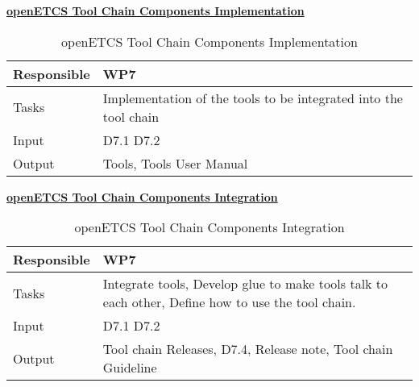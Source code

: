 \documentclass{template/openetcs_article}
\begin{document}
\newpage
\underline{\textbf{openETCS Tool Chain Components Implementation}}
\begin{table}[H]
	\begin{center}	
		\tablehead{\hline
			}
		
		\begin{supertabular}[H]{|p{6cm}|p{8cm}|}
			\hline

			Responsible &
			WP7 \\
			\hline

			Tasks & 
			Implementation of the tools to be integrated into the tool chain\\ \hline

			Input &
			D7.1
			D7.2\\
			\hline

			Output &
			Tools, Tools User Manual\\
			\hline			
		\end{supertabular}
	\end{center}

	\caption{openETCS Tool Chain Components Implementation}
\end{table}

\underline{\textbf{openETCS Tool Chain Components Integration}}
\begin{table}[H]
	\begin{center}


		\begin{supertabular}[H]{|p{6cm}|p{8cm}|}
			\hline
			
			Responsible &
			WP7 \\
			\hline
			

			Tasks &
			Integrate tools, Develop glue to make tools talk to each other, Define how to use the tool chain. \\	\hline
			
			Input &
			D7.1
			D7.2\\
			\hline
			
			Output &
			Tool chain  Releases,
			D7.4,
			Release note, 
			Tool chain Guideline\\
			\hline
			
		\end{supertabular}
	\end{center}
	\caption{openETCS Tool Chain Components Integration}
\end{table}
\end{document}
